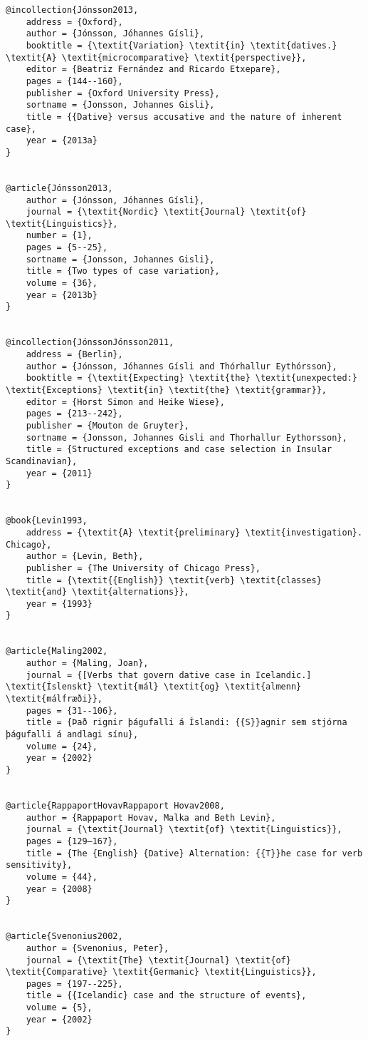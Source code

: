 \documentclass[output=paper,modfonts,nonflat]{langsci/langscibook}
\begin{document}
\begin{verbatim}
@incollection{Jónsson2013,
	address = {Oxford},
	author = {Jónsson, Jóhannes Gísli},
	booktitle = {\textit{Variation} \textit{in} \textit{datives.} \textit{A} \textit{microcomparative} \textit{perspective}},
	editor = {Beatriz Fernández and Ricardo Etxepare},
	pages = {144--160},
	publisher = {Oxford University Press},
	sortname = {Jonsson, Johannes Gisli},
	title = {{Dative} versus accusative and the nature of inherent case},
	year = {2013a}
}


@article{Jónsson2013,
	author = {Jónsson, Jóhannes Gísli},
	journal = {\textit{Nordic} \textit{Journal} \textit{of} \textit{Linguistics}},
	number = {1},
	pages = {5--25},
	sortname = {Jonsson, Johannes Gisli},
	title = {Two types of case variation},
	volume = {36},
	year = {2013b}
}


@incollection{JónssonJónsson2011,
	address = {Berlin},
	author = {Jónsson, Jóhannes Gísli and Thórhallur Eythórsson},
	booktitle = {\textit{Expecting} \textit{the} \textit{unexpected:} \textit{Exceptions} \textit{in} \textit{the} \textit{grammar}},
	editor = {Horst Simon and Heike Wiese},
	pages = {213--242},
	publisher = {Mouton de Gruyter},
	sortname = {Jonsson, Johannes Gisli and Thorhallur Eythorsson},
	title = {Structured exceptions and case selection in Insular Scandinavian},
	year = {2011}
}


@book{Levin1993,
	address = {\textit{A} \textit{preliminary} \textit{investigation}. Chicago},
	author = {Levin, Beth},
	publisher = {The University of Chicago Press},
	title = {\textit{{English}} \textit{verb} \textit{classes} \textit{and} \textit{alternations}},
	year = {1993}
}


@article{Maling2002,
	author = {Maling, Joan},
	journal = {[Verbs that govern dative case in Icelandic.] \textit{Íslenskt} \textit{mál} \textit{og} \textit{almenn} \textit{málfræði}},
	pages = {31--106},
	title = {Það rignir þágufalli á Íslandi: {{S}}agnir sem stjórna þágufalli á andlagi sínu},
	volume = {24},
	year = {2002}
}


@article{RappaportHovavRappaport Hovav2008,
	author = {Rappaport Hovav, Malka and Beth Levin},
	journal = {\textit{Journal} \textit{of} \textit{Linguistics}},
	pages = {129–167},
	title = {The {English} {Dative} Alternation: {{T}}he case for verb sensitivity},
	volume = {44},
	year = {2008}
}


@article{Svenonius2002,
	author = {Svenonius, Peter},
	journal = {\textit{The} \textit{Journal} \textit{of} \textit{Comparative} \textit{Germanic} \textit{Linguistics}},
	pages = {197--225},
	title = {{Icelandic} case and the structure of events},
	volume = {5},
	year = {2002}
}



\end{verbatim}
\end{document}

